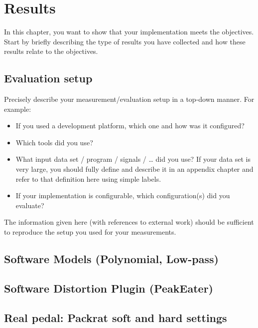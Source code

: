 \chapter{Results}
\label{ch:results}

In this chapter, you want to show that your implementation meets the objectives.
Start by briefly describing the type of results you have collected and how these results relate to the objectives.

\section{Evaluation setup}
\label{sec:results_setup}

Precisely describe your measurement/evaluation setup in a top-down manner.
For example:
\begin{itemize}
  \item If you used a development platform, which one and how was it configured?
  \item Which tools did you use?
  \item What input data set / program / signals / \ldots{} did you use?
    If your data set is very large, you should fully define and describe it in an appendix chapter and refer to that definition here using simple labels.
  \item If your implementation is configurable, which configuration(s) did you evaluate?
\end{itemize}

The information given here (with references to external work) should be sufficient to reproduce the setup you used for your measurements.


\section{Software Models (Polynomial, Low-pass)}
\label{sec:results_math}

\section{Software Distortion Plugin (PeakEater)}
\label{sec:results_peakeater}

\section{Real pedal: Packrat soft and hard settings}
\label{sec:results_packrat}

